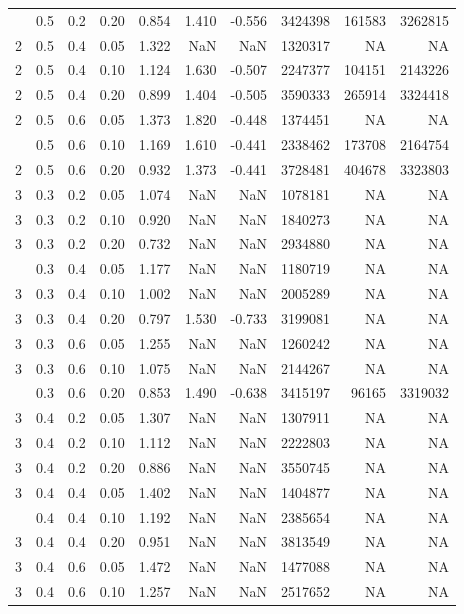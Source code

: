 \documentclass[
]{article}
\begin{document}
\begin{longtable}[t]{rrrrrrrrrr}
\addlinespace
2 & 0.5 & 0.2 & 0.20 & 0.854 & 1.410 & -0.556 & 3424398 & 161583 & 3262815\\
2 & 0.5 & 0.4 & 0.05 & 1.322 & NaN & NaN & 1320317 & NA & NA\\
2 & 0.5 & 0.4 & 0.10 & 1.124 & 1.630 & -0.507 & 2247377 & 104151 & 2143226\\
2 & 0.5 & 0.4 & 0.20 & 0.899 & 1.404 & -0.505 & 3590333 & 265914 & 3324418\\
2 & 0.5 & 0.6 & 0.05 & 1.373 & 1.820 & -0.448 & 1374451 & NA & NA\\
\addlinespace
2 & 0.5 & 0.6 & 0.10 & 1.169 & 1.610 & -0.441 & 2338462 & 173708 & 2164754\\
2 & 0.5 & 0.6 & 0.20 & 0.932 & 1.373 & -0.441 & 3728481 & 404678 & 3323803\\
3 & 0.3 & 0.2 & 0.05 & 1.074 & NaN & NaN & 1078181 & NA & NA\\
3 & 0.3 & 0.2 & 0.10 & 0.920 & NaN & NaN & 1840273 & NA & NA\\
3 & 0.3 & 0.2 & 0.20 & 0.732 & NaN & NaN & 2934880 & NA & NA\\
\addlinespace
3 & 0.3 & 0.4 & 0.05 & 1.177 & NaN & NaN & 1180719 & NA & NA\\
3 & 0.3 & 0.4 & 0.10 & 1.002 & NaN & NaN & 2005289 & NA & NA\\
3 & 0.3 & 0.4 & 0.20 & 0.797 & 1.530 & -0.733 & 3199081 & NA & NA\\
3 & 0.3 & 0.6 & 0.05 & 1.255 & NaN & NaN & 1260242 & NA & NA\\
3 & 0.3 & 0.6 & 0.10 & 1.075 & NaN & NaN & 2144267 & NA & NA\\
\addlinespace
3 & 0.3 & 0.6 & 0.20 & 0.853 & 1.490 & -0.638 & 3415197 & 96165 & 3319032\\
3 & 0.4 & 0.2 & 0.05 & 1.307 & NaN & NaN & 1307911 & NA & NA\\
3 & 0.4 & 0.2 & 0.10 & 1.112 & NaN & NaN & 2222803 & NA & NA\\
3 & 0.4 & 0.2 & 0.20 & 0.886 & NaN & NaN & 3550745 & NA & NA\\
3 & 0.4 & 0.4 & 0.05 & 1.402 & NaN & NaN & 1404877 & NA & NA\\
\addlinespace
3 & 0.4 & 0.4 & 0.10 & 1.192 & NaN & NaN & 2385654 & NA & NA\\
3 & 0.4 & 0.4 & 0.20 & 0.951 & NaN & NaN & 3813549 & NA & NA\\
3 & 0.4 & 0.6 & 0.05 & 1.472 & NaN & NaN & 1477088 & NA & NA\\
3 & 0.4 & 0.6 & 0.10 & 1.257 & NaN & NaN & 2517652 & NA & NA\\

\end{longtable}
\end{document}
